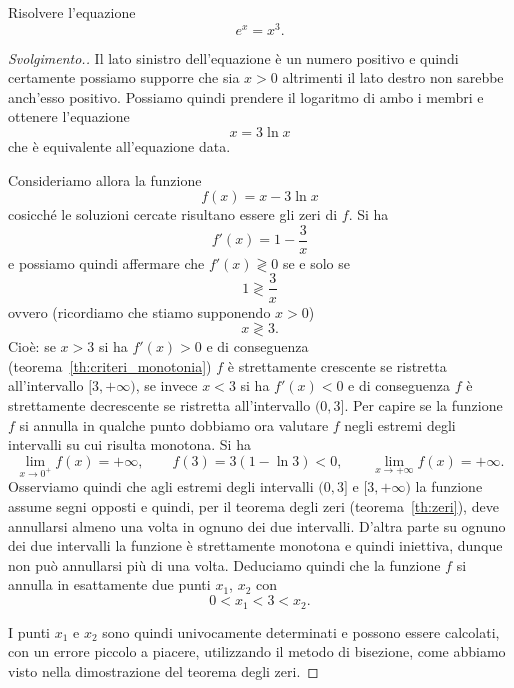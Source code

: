 \begin{exercise}
Risolvere l'equazione
\begin{equation} \label{eq:4734521}
  e^x = x^3.
\end{equation}
\end{exercise}
%
\begin{proof}[Svolgimento.]
Il lato sinistro dell'equazione è un numero positivo e quindi
certamente possiamo supporre che sia $x>0$ altrimenti il lato destro non sarebbe anch'esso positivo.
Possiamo quindi prendere il logaritmo di ambo i membri
e ottenere l'equazione
\[
  x = 3 \ln x
\]
che è equivalente all'equazione data.

Consideriamo allora la funzione
\[
 f(x) = x - 3 \ln x
\]
cosicché le soluzioni cercate risultano essere gli zeri di $f$.
Si ha
\[
  f'(x) = 1 - \frac{3}{x}
\]
e possiamo quindi affermare che
%
$f'(x) \gtrless 0$
se e solo se
\[
  1 \gtrless \frac 3 x
\]
ovvero (ricordiamo che stiamo supponendo $x>0$)
\[
  x \gtrless 3.
\]
Cioè: se $x>3$ si ha $f'(x)>0$ e di conseguenza
(teorema~\ref{th:criteri_monotonia})
$f$ è strettamente crescente se ristretta all'intervallo
$[3,+\infty)$,
se invece $x<3$ si ha $f'(x)<0$ e di conseguenza
$f$ è strettamente decrescente se ristretta all'intervallo
$(0,3]$.
Per capire se la funzione $f$ si annulla in qualche punto
dobbiamo ora valutare $f$ negli estremi degli intervalli su cui risulta monotona. Si ha
\[
  \lim_{x\to 0^+} f(x) = +\infty, \qquad
  f(3) = 3 (1 - \ln 3) <0, \qquad
  \lim_{x\to +\infty} f(x) = +\infty.
\]
Osserviamo quindi che agli estremi degli intervalli
$(0,3]$ e $[3,+\infty)$ la funzione assume segni opposti e quindi, per il teorema degli zeri (teorema~\ref{th:zeri}), deve annullarsi almeno una volta in ognuno dei due intervalli. D'altra parte su ognuno dei due intervalli la funzione è strettamente monotona e quindi iniettiva, dunque non può annullarsi più di una volta. Deduciamo quindi che la funzione $f$ si annulla in esattamente due punti $x_1$, $x_2$ con
\[
  0 < x_1 < 3 < x_2.
\]

I punti $x_1$ e $x_2$ sono quindi univocamente determinati
e possono essere calcolati, con un errore piccolo a piacere,
utilizzando il metodo di bisezione, come abbiamo
visto nella dimostrazione del teorema degli zeri.
\end{proof}

